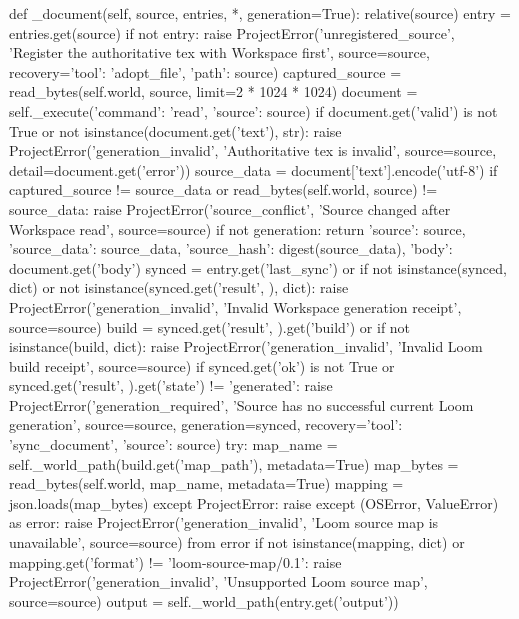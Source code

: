     def _document(self, source, entries, *, generation=True):
        relative(source)
        entry = entries.get(source)
        if not entry:
            raise ProjectError('unregistered_source', 'Register the authoritative tex with Workspace first',
                               source=source, recovery={'tool': 'adopt_file', 'path': source})
        captured_source = read_bytes(self.world, source, limit=2 * 1024 * 1024)
        document = self._execute({'command': 'read', 'source': source})
        if document.get('valid') is not True or not isinstance(document.get('text'), str):
            raise ProjectError('generation_invalid', 'Authoritative tex is invalid', source=source,
                               detail=document.get('error'))
        source_data = document['text'].encode('utf-8')
        if captured_source != source_data or read_bytes(self.world, source) != source_data:
            raise ProjectError('source_conflict', 'Source changed after Workspace read', source=source)
        if not generation:
            return {'source': source, 'source_data': source_data, 'source_hash': digest(source_data),
                    'body': document.get('body')}
        synced = entry.get('last_sync') or {}
        if not isinstance(synced, dict) or not isinstance(synced.get('result', {}), dict):
            raise ProjectError('generation_invalid', 'Invalid Workspace generation receipt', source=source)
        build = synced.get('result', {}).get('build') or {}
        if not isinstance(build, dict):
            raise ProjectError('generation_invalid', 'Invalid Loom build receipt', source=source)
        if synced.get('ok') is not True or synced.get('result', {}).get('state') != 'generated':
            raise ProjectError('generation_required', 'Source has no successful current Loom generation',
                               source=source, generation=synced,
                               recovery={'tool': 'sync_document', 'source': source})
        try:
            map_name = self._world_path(build.get('map_path'), metadata=True)
            map_bytes = read_bytes(self.world, map_name, metadata=True)
            mapping = json.loads(map_bytes)
        except ProjectError:
            raise
        except (OSError, ValueError) as error:
            raise ProjectError('generation_invalid', 'Loom source map is unavailable', source=source) from error
        if not isinstance(mapping, dict) or mapping.get('format') != 'loom-source-map/0.1':
            raise ProjectError('generation_invalid', 'Unsupported Loom source map', source=source)
        output = self._world_path(entry.get('output'))

